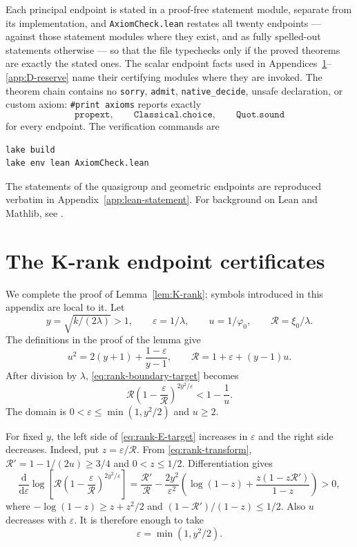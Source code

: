 \documentclass[11pt]{article}
\theoremstyle{definition}
\theoremstyle{remark}
\begin{document}
Each principal endpoint is stated in a proof-free statement module,
separate from its implementation, and \texttt{AxiomCheck.lean} restates
all twenty endpoints --- against those statement modules where they
exist, and as fully spelled-out statements otherwise --- so that the
file typechecks only if the proved theorems are exactly the stated
ones.  The scalar endpoint facts used in
Appendices~\ref{app:rank}--\ref{app:D-reserve} name their certifying
modules where they are invoked.  The theorem chain contains no
\texttt{sorry}, \texttt{admit}, \texttt{native\_decide}, unsafe
declaration, or custom axiom: \texttt{\#print axioms} reports exactly
\[
 \texttt{propext},\qquad \texttt{Classical.choice},\qquad
 \texttt{Quot.sound}
\]
for every endpoint.  The verification commands are
\begin{lstlisting}[language=bash]
lake build
lake env lean AxiomCheck.lean
\end{lstlisting}
The statements of the quasigroup and geometric endpoints are reproduced
verbatim in Appendix~\ref{app:lean-statement}.
For background on Lean and Mathlib, see \cite{demoura2021lean4,mathlib2020}.


\section{The K-rank endpoint certificates}\label{app:rank}

We complete the proof of Lemma~\ref{lem:K-rank}; symbols introduced in
this appendix are local to it.  Let
\[
 y=\sqrt{k/(2\lambda)}>1,\qquad \varepsilon=1/\lambda,\qquad
 u=1/\varphi_0,\qquad \mathcal R=\xi_0/\lambda.
\]
The definitions in the proof of the lemma give
\begin{equation}\label{eq:rank-transform}
 u^2=2(y+1)+\frac{1-\varepsilon}{y-1},\qquad
 \mathcal R=1+\varepsilon+(y-1)u.
\end{equation}
After division by $\lambda$, \eqref{eq:rank-boundary-target} becomes
\begin{equation}\label{eq:rank-E-target}
 \mathcal R\left(1-\frac{\varepsilon}{\mathcal R}\right)^{2y^2/\varepsilon}
 <1-\frac1u.
\end{equation}
The domain is $0<\varepsilon\le\min(1,y^2/2)$ and $u\ge2$.

For fixed $y$, the left side of \eqref{eq:rank-E-target} increases in
$\varepsilon$ and the right side decreases.  Indeed, put
$z=\varepsilon/\mathcal R$.  From
\eqref{eq:rank-transform},
$\mathcal R'=1-1/(2u)\ge3/4$ and $0<z\le1/2$.  Differentiation gives
\[
 \frac{\mathrm d}{\mathrm d \varepsilon}\log\left[\mathcal R
   \left(1-\frac \varepsilon{\mathcal R}\right)^{2y^2/\varepsilon}\right]
 =\frac{\mathcal R'}{\mathcal R}
 -\frac{2y^2}{\varepsilon^2}
 \left(\log(1-z)+\frac{z(1-z\mathcal R')}{1-z}\right)>0,
\]
where $-\log(1-z)\ge z+z^2/2$ and
$(1-\mathcal R')/(1-z)\le1/2$.  Also $u$ decreases with $\varepsilon$.
It is therefore enough to take
\begin{equation}\label{eq:rank-Emax}
 \varepsilon=\min(1,y^2/2).
\end{equation}
\end{document}
